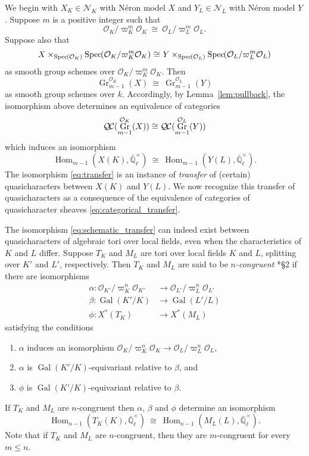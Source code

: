 \documentclass[CM,Submssn,SecEq]{degruyter-crelle} %
\theoremstyle{plain}
\theoremstyle{definition}
\theoremstyle{remark}
\newcommand{\EE}{\mathbb{\bar Q}_\ell}
\newcommand{\OK}{\mathcal{O}_K}
\newcommand{\OL}{\mathcal{O}_L}
\newcommand{\OO}[1]{\mathcal{O}_{#1}}
\newcommand{\Fq}{k}
\newcommand{\EEx}{\EE^\times}
\DeclareMathOperator{\Gal}{Gal}
\DeclareMathOperator{\Hom}{Hom}
\DeclareMathOperator{\Gr}{Gr}
\newcommand{\Spec}[1]{{\operatorname{Spec}\hskip-1pt( #1 )}}
\newcommand{\iso}{{\ \cong\ }}
\newcommand{\QC}{{\mathcal{Q\hskip-0.8pt C}}}
\begin{document}
We begin with $X_K\in \mathcal{N}_K$ with N\'eron model $X$ and $Y_{L}\in \mathcal{N}_L$ with N\'eron model $Y$.
Suppose $m$ is a positive integer such that 
\[
\OK/\varpi_K^{m}\OK \iso \OL/\varpi_L^{m}\OL.
\]
Suppose also that
\begin{equation}\label{eq:schematic_transfer}
X \times_{\Spec{\OK}} \Spec{\OK/\varpi_K^{m}\OK} \iso Y \times_{\Spec{\OL}} \Spec{\OL/\varpi_L^{m}\OL}
\end{equation}
as smooth group schemes over $\OK/\varpi_K^{m}\OK$. 
Then
\[
\Gr^{\OK}_{m-1}(X) \iso \Gr^{\OL}_{m-1}(Y)
\]
as smooth group schemes over $\Fq$.  Accordingly, by Lemma~\ref{lem:pullback}, the isomorphism above determines an equivalence of categories
\begin{equation}\label{eq:categorical_transfer}
\QC(\Gr^{\OK}_{m-1}(X)) \cong \QC(\Gr^{\OL}_{m-1}(Y))
\end{equation}
which induces an isomorphism
\begin{equation}\label{eq:transfer}
\Hom_{m-1}(X(K),\EEx)  \iso  \Hom_{m-1}(Y(L),\EEx).
\end{equation}
The isomorphism \eqref{eq:transfer} is an instance of {\it transfer} of (certain) quasicharacters between $X(K)$ and $Y(L)$. 
We now recognize this transfer of quasicharacters as a consequence of the equivalence of categories of quasicharacter sheaves \eqref{eq:categorical_transfer}.

The isomorphism \eqref{eq:schematic_transfer} can indeed exist between quasicharacters of algebraic tori over local fields, even when the characteristics of $K$ and $L$ differ.
Suppose $T_K$ and $M_L$ are tori over local fields $K$ and $L$,
splitting over $K'$ and $L'$, respectively.
Then $T_K$ and $M_L$ are said to be \emph{$n$-congruent} \cite{chai-yu:01a}*{\S 2} if there are isomorphisms
 \begin{align*}
  \alpha : \OO{K'}/\varpi_K^n \OO{K'} &\to \OO{L'}/\varpi_{L}^n \OO{L'} \\
  \beta : \Gal(K'/K) &\to \Gal(L'/L) \\
  \phi : X^*(T_K) &\to X^*(M_L)
 \end{align*}
 satisfying the conditions
 \begin{enumerate}
  \item $\alpha$ induces an isomorphism $\OK/\varpi_K^n \OK \to \OO{L}/\varpi_{L}^n \OO{L}$,
  \item $\alpha$ is $\Gal(K'/K)$-equivariant relative to $\beta$, and
  \item $\phi$ is $\Gal(K'/K)$-equivariant relative to $\beta$.
 \end{enumerate}
If $T_K$ and $M_L$ are $n$-congruent then $\alpha$, $\beta$ and $\phi$ determine an isomorphism 
\begin{equation}\label{transfer}
  \Hom_{n-1}(T_K(K), \EEx) \iso \Hom_{n-1}(M_L(L),\EEx).
\end{equation}
Note that if $T_K$ and $M_L$ are $n$-congruent, then they are $m$-congruent for every
$m \leq n$.
%
\end{document}
